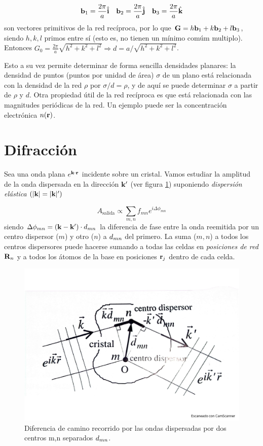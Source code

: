 \begin{equation*}
    \mathbf{b}_1 = \frac{2\pi}{a} \hat{\mathbf{i}} \quad \mathbf{b}_2 = \frac{2\pi}{a} \hat{\mathbf{j}} \quad \mathbf{b}_3 = \frac{2\pi}{a} \hat{\mathbf{k}}
\end{equation*}
son vectores primitivos de la red recíproca, por lo que $\mathbf{G}=h\mathbf{b}_1+k\mathbf{b}_2+l\mathbf{b}_3$, siendo $h,k,l$ primos entre sí (esto es, no tienen un mínimo comúm multiplo). Entonces $G_0=\frac{2\pi}{a} \sqrt{h^2 + k^2 + l^2} \Rightarrow d = a/ \sqrt{h^2 + k^2 + l^2}$. 

Esto a su vez permite determinar de forma sencilla densidades planares: la densidad de puntos (puntos por unidad de área) $\sigma$ de un plano está relacionada con la densidad de la red $\rho$ por $\sigma/d = \rho$, y de aquí se puede determinar $\sigma$ a partir de $\rho$ y $d$. Otra propiedad útil de la red recíproca es que está relacionada con las magnitudes periódicas de la red. Un ejemplo puede ser la concentración electrónica $n(\mathbf{r})$.

\section{Difracción}

Sea una onda plana $e^{\mathbf{k} \cdot \mathbf{r}}$ incidente sobre un cristal. Vamos estudiar la amplitud de la onda dispersada en la dirección $\mathbf{k}'$ (ver figura \ref{Fig:02-02}) suponiendo \textit{dispersión elástica} $(|\mathbf{k}|=|\mathbf{k}|')$

\begin{equation}
    A_{\text{salida}} \propto \sum_{m,n} f_{mn} e^{i \Delta \phi_{mn}}
\end{equation}
siendo $\Delta \phi_{mn} = (\mathbf{k} - \mathbf{k}') \cdot \mathbf{}d_{mn}$ la diferencia de fase entre la onda reemitida por un centro dispersor ($m$) y otro ($n$) a $\mathbf{}d_{mn}$ del primero. La suma ($m,n$) a todos los centros dispersores puede hacerse sumando a todas las celdas en \textit{posiciones de red} $\mathbf{R}_n$ y a todos los átomos de la base en posiciones $\mathbf{r}_j$ dentro de cada celda. 

\begin{figure}[h!] \centering
    \includegraphics[scale=0.35]{Cuerpo/Ch_02/Fotos_libro 2.pdf}
    \caption{Diferencia de camino recorrido por las ondas dispersadas por dos centros m,n separados $\mathbf{}d_{mn}$.}
    \label{Fig:02-02}
\end{figure}

